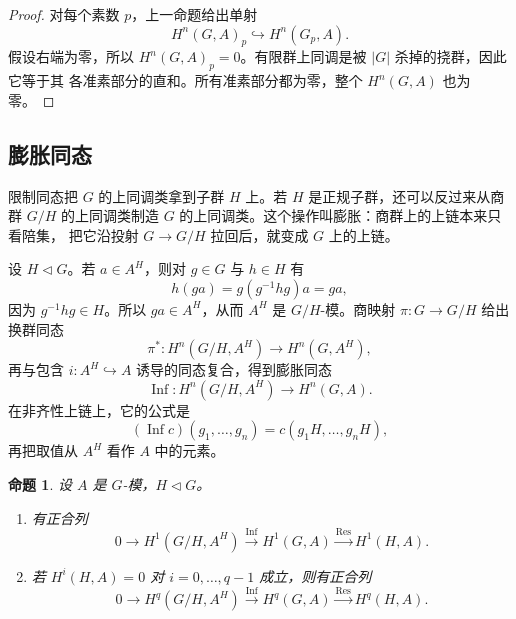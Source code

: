 \documentclass[11pt,a4paper,openany]{ctexbook}
\numberwithin{equation}{chapter}
\theoremstyle{plain}
\newtheorem{proposition}[theorem]{命题}
\theoremstyle{definition}
\theoremstyle{remark}
\begin{document}
\begin{proof}
对每个素数 $p$，上一命题给出单射
\[
H^n(G,A)_p\hookrightarrow H^n(G_p,A).
\]
假设右端为零，所以 $H^n(G,A)_p=0$。有限群上同调是被 $|G|$ 杀掉的挠群，因此它等于其
各准素部分的直和。所有准素部分都为零，整个 $H^n(G,A)$ 也为零。
\end{proof}

\subsection{膨胀同态}

限制同态把 $G$ 的上同调类拿到子群 $H$ 上。若 $H$ 是正规子群，还可以反过来从商群
$G/H$ 的上同调类制造 $G$ 的上同调类。这个操作叫膨胀：商群上的上链本来只看陪集，
把它沿投射 $G\to G/H$ 拉回后，就变成 $G$ 上的上链。

设 $H\triangleleft G$。若 $a\in A^H$，则对 $g\in G$ 与 $h\in H$ 有
\[
h(ga)=g(g^{-1}hg)a=ga,
\]
因为 $g^{-1}hg\in H$。所以 $ga\in A^H$，从而 $A^H$ 是 $G/H$-模。商映射
$\pi:G\to G/H$ 给出换群同态
\[
\pi^\ast:H^n(G/H,A^H)\to H^n(G,A^H),
\]
再与包含 $i:A^H\hookrightarrow A$ 诱导的同态复合，得到膨胀同态
\[
 \operatorname{Inf}:H^n(G/H,A^H)\to H^n(G,A).
\]
在非齐性上链上，它的公式是
\[
(\operatorname{Inf}c)(g_1,\ldots,g_n)
=c(g_1H,\ldots,g_nH),
\]
再把取值从 $A^H$ 看作 $A$ 中的元素。

\begin{proposition}
设 $A$ 是 $G$-模，$H\triangleleft G$。
\begin{enumerate}[label=(\arabic*)]
\item 有正合列
\[
 0\to H^1(G/H,A^H)\xrightarrow{\operatorname{Inf}}
 H^1(G,A)\xrightarrow{\operatorname{Res}}H^1(H,A).
\]
\item 若 $H^i(H,A)=0$ 对 $i=0,\ldots,q-1$ 成立，则有正合列
\[
 0\to H^q(G/H,A^H)\xrightarrow{\operatorname{Inf}}
 H^q(G,A)\xrightarrow{\operatorname{Res}}H^q(H,A).
\]
\end{enumerate}
\end{proposition}
\end{document}
